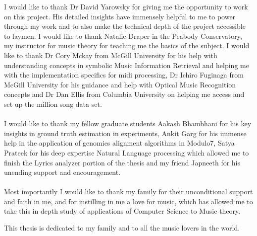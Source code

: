 \begin{frontmatter}
\begin{acknowledgment}

\noindent I would like to thank Dr David Yarowsky for giving me the opportunity to work on this project. His detailed insights have immensely helpful to me to power through my work and to also make the technical depth of the project accessible to laymen. I would like to thank Natalie Draper in the Peabody Conservatory, my instructor for music theory for teaching me the basics of the subject. I would like to thank Dr Cory Mckay from McGill University for his help with understanding concepts in symbolic Music Information Retrieval and helping me with the implementation specifics for midi processing, Dr Ichiro Fuginaga from McGill University for his guidance and help with Optical Music Recognition concepts and Dr Dan Ellis from Columbia University on helping me access and set up the million song data set.  \\\\
I would like to thank my fellow graduate students Aakash Bhambhani for his key insights in ground truth estimation in experiments, Ankit Garg for his immense help in the application of genomics alignment algorithms in Modulo7, Satya Prateek for his deep expertise Natural Language processing which allowed me to finish the Lyrics analyzer portion of the thesis and my friend Japneeth for his unending support and encouragement. \\\\
Most importantly I would like to thank my family for their unconditional support and faith in me, and for instilling in me a love for music, which has allowed me to take this in depth study of applications of Computer Science to Music theory.

\end{acknowledgment}

\begin{dedication}
 
\noindent This thesis is dedicated to my family and to all the music lovers in the world. 

\end{dedication}

\tableofcontents

\listoftables

\listoffigures

\end{frontmatter}
